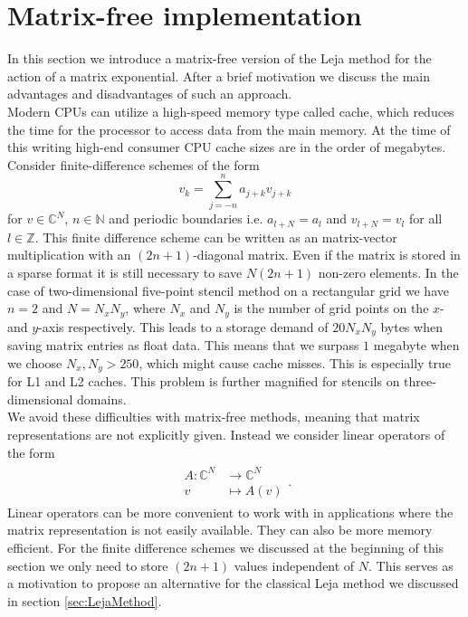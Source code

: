 \documentclass{scrartcl}
\begin{document}
	\section{Matrix-free implementation}\label{sec:matrixfreeimplementation}
	In this section we introduce a matrix-free version of the Leja method for the action of a matrix exponential. After a brief motivation we discuss the main advantages and disadvantages of such an approach. \\
	Modern CPUs can utilize a high-speed memory type called cache, which reduces the time for the processor to access data from the main memory. At the time of this writing high-end consumer CPU cache sizes are in the order of megabytes. Consider finite-difference schemes of the form
	\[
	v_k = \sum_{j=-n}^{n} a_{j+k}v_{j+k}
	\]
	for $v\in\mathbb{C}^N$, $n\in\mathbb{N}$ and periodic boundaries i.e. $a_{l+N} = a_{l}$ and $v_{l+N}=v_{l}$ for all $l\in\mathbb{Z}$. 
	This finite difference scheme can be written as an matrix-vector multiplication with an $(2n+1)$-diagonal matrix. Even if the matrix is stored in a sparse format it is still necessary to save $N(2n+1)$ non-zero elements. In the case of two-dimensional five-point stencil method on a rectangular grid we have $n=2$ and $N=N_{x}N_{y}$, where $N_{x}$ and $N_{y}$ is the number of grid points on the $x$- and $y$-axis respectively. This leads to a storage demand of $20N_xN_y$ bytes when saving matrix entries as float data. This means that we surpass $1$ megabyte when we choose $N_x,N_y > 250$, which might cause cache misses. This is especially true for L1 and L2 caches. This problem is further magnified for stencils on three-dimensional domains. \\	
	We avoid these difficulties with matrix-free methods, meaning that matrix representations are not explicitly given. Instead we consider linear operators of the form
	\begin{align*}
	\begin{split}
	A\!:\mathbb{C}^{N}&\to\mathbb{C}^{N}\\
	v&\mapsto A(v)
	\end{split}.
	\end{align*}
	Linear operators can be more convenient to work with in applications where the matrix representation is not easily available. They can also be more memory efficient. For the finite difference schemes we discussed at the beginning of this section we only need to store $(2n+1)$ values independent of $N$. This serves as a motivation to propose an alternative for the classical Leja method we discussed in section \ref{sec:LejaMethod}.
\end{document}
